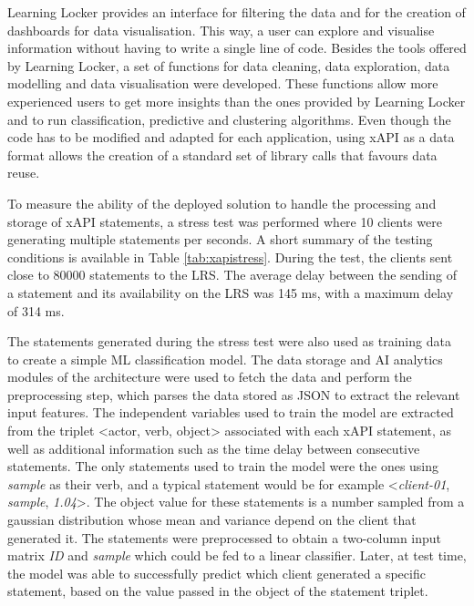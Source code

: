 Learning Locker provides an interface for filtering the data and for the creation of dashboards for data visualisation. This way, a user can explore and visualise information without having to write a single line of code. Besides the tools offered by Learning Locker, a set of functions for data cleaning, data exploration, data modelling and data visualisation were developed. These functions allow more experienced users to get more insights than the ones provided by Learning Locker and to run classification, predictive and clustering algorithms. Even though the code has to be modified and adapted for each application, using xAPI as a data format allows the creation of a standard set of library calls that favours data reuse.

To measure the ability of the deployed solution to handle the processing and storage of xAPI statements, a stress test was performed where 10 clients were generating multiple statements per seconds. A short summary of the testing conditions is available in Table \ref{tab:xapistress}. During the test, the clients sent close to 80000 statements to the LRS. The average delay between the sending of a statement and its availability on the LRS was 145 ms, with a maximum delay of 314 ms. 

The statements generated during the stress test were also used as training data to create a simple ML classification model. The data storage and AI analytics modules of the architecture were used to fetch the data and perform the preprocessing step, which parses the data stored as JSON to extract the relevant input features. The independent variables used to train the model are extracted from the triplet \textless actor, verb, object\textgreater{} associated with each xAPI statement, as well as additional information such as the time delay between consecutive statements. The only statements used to train the model were the ones using \textit{sample} as their verb, and a typical statement would be for example \textless \emph{client-01}, \textit{sample}, \emph{1.04}\textgreater{}. The object value for these statements is a number sampled from a gaussian distribution whose mean and variance depend on the client that generated it. The statements were preprocessed to obtain a two-column input matrix \textendash{} \emph{ID} and \emph{sample} \textendash{} which could be fed to a linear classifier. Later, at test time, the model was able to successfully predict which client generated a specific statement, based on the value passed in the object of the statement triplet.


